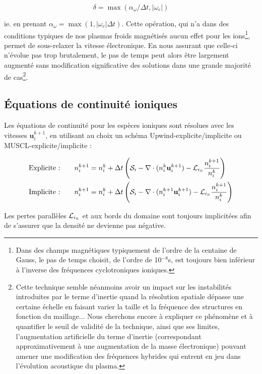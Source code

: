\begin{refsection}
\begin{equation}
\delta=\max(\alpha_\omega/\Delta t,|\omega_c|)
\end{equation}

ie. en prenant $\alpha_\omega=\max(1,|\omega_c|\Delta t)$.
Cette opération, qui n'a dans des conditions typiques de nos plasmas froids
magnétisés aucun effet pour les ions\footnote{Dans des champs magnétiques
typiquement de l'ordre de la centaine de Gauss, le pas de temps choisit, de l'ordre de 10$^{-8}$s, est toujours bien
inférieur à l'inverse des fréquences cyclotroniques ioniques.}, permet de
sous-relaxer la vitesse électronique. En nous assurant
que celle-ci n'évolue pas trop brutalement, le pas de temps peut alors être
largement augmenté sans modification significative des solutions dans une
grande majorité de cas\footnote{Cette
technique semble néanmoins avoir un impact sur les
instabilités introduites par le terme d'inertie quand la résolution spatiale
dépasse une certaine échelle en faisant varier la taille et la fréquence des
structures en fonction du maillage...
Nous cherchons encore à expliquer ce phénomène et à quantifier le seuil de
validité de la technique, ainsi que ses limites, l'augmentation artificielle du
terme d'inertie (correspondant approximativement à une augmentation de la masse
électronique) pouvant amener une modification des fréquences hybrides qui entrent en jeu dans
l'évolution acoustique du plasma.}.

\subsection{Équations de continuité ioniques}
Les équations de continuité pour les espèces ioniques sont résolues avec les
vitesses $\mathbf u_i^{k+1}$, en utilisant au choix un schéma
Upwind-explicite/implicite ou MUSCL-explicite/implicite :

\begin{align}
\text{Explicite :\qquad}& n_i^{k+1}=n_i^{k}+\Delta
t\left(\mathcal S_i-\nabla\cdot(n_i^{k}\mathbf
u_i^{k+1})-\mathcal L_{i_\para}\frac{n_i^{k+1}}{n_i^k}\right)\\
\text{Implicite :\qquad}&n_i^{k+1}=n_i^{k}+\Delta
t\left(\mathcal S_i-\nabla\cdot(n_i^{k+1}\mathbf
u_i^{k+1})-\mathcal L_{i_\para}\frac{n_i^{k+1}}{n_i^k}\right)
\end{align}

Les pertes parallèles $\mathcal {L}_{i_\para}$ et aux bords du
domaine sont toujours implicitées afin de s'assurer que la densité ne devienne
pas négative.


\end{refsection}
